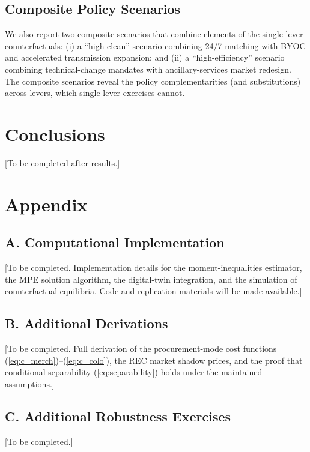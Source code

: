\documentclass[12pt,letterpaper]{article}
\begin{document}
\subsection{Composite Policy Scenarios}

We also report two composite scenarios that combine elements of the
single-lever counterfactuals: (i) a ``high-clean'' scenario combining
24/7 matching with BYOC and accelerated transmission expansion; and
(ii) a ``high-efficiency'' scenario combining technical-change mandates
with ancillary-services market redesign. The composite scenarios reveal
the policy complementarities (and substitutions) across levers, which
single-lever exercises cannot.

\section{Conclusions}
\label{sec:conclusion}

[To be completed after results.]

\section*{Appendix}
\label{sec:appendix}

\subsection*{A. Computational Implementation}

[To be completed. Implementation details for the moment-inequalities
estimator, the MPE solution algorithm, the digital-twin integration, and
the simulation of counterfactual equilibria. Code and replication
materials will be made available.]

\subsection*{B. Additional Derivations}

[To be completed. Full derivation of the procurement-mode cost
functions (\ref{eq:c_merch})--(\ref{eq:c_colo}), the REC market shadow
prices, and the proof that conditional separability (\ref{eq:separability})
holds under the maintained assumptions.]

\subsection*{C. Additional Robustness Exercises}

[To be completed.]

\newpage


\end{document}
